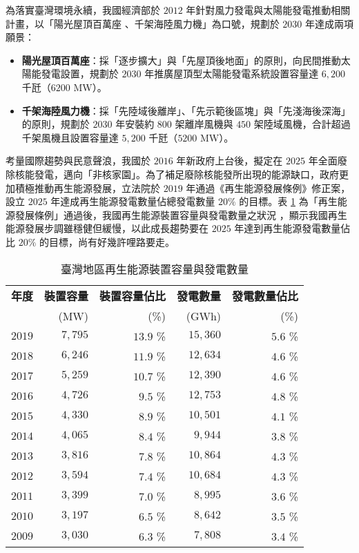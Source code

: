 為落實臺灣環境永續，我國經濟部於 $2012$ 年針對風力發電與太陽能發電推動相關計畫，以「陽光屋頂百萬座 、千架海陸風力機」為口號，規劃於 $2030$ 年達成兩項願景：

\begin{itemize}
  \item \textbf{陽光屋頂百萬座}：採「逐步擴大」與「先屋頂後地面」的原則，向民間推動太陽能發電設置，規劃於 $2030$ 年推廣屋頂型太陽能發電系統設置容量達 $6,200$ 千瓩（$6200$ \si{\MW}）。
  \item \textbf{千架海陸風力機}：採「先陸域後離岸」、「先示範後區塊」與「先淺海後深海」的原則，規劃於 $2030$ 年安裝約 $800$ 架離岸風機與 $450$ 架陸域風機，合計超過千架風機且設置容量達 $5,200$ 千瓩（$5200$ \si{\MW}）。
\end{itemize}

考量國際趨勢與民意聲浪，我國於 $2016$ 年新政府上台後，擬定在 $2025$ 年全面廢除核能發電，邁向「非核家園」。為了補足廢除核能發所出現的能源缺口，政府更加積極推動再生能源發展，立法院於 $2019$ 年通過《再生能源發展條例》修正案，設立 $2025$ 年達成再生能源發電數量佔總發電數量 $20\%$ 的目標。表 \ref{table: Renewable Energy Device Ratio in Taiwan} 為「再生能源發展條例」通過後，我國再生能源裝置容量與發電數量之狀況 \cite{boe-data}，顯示我國再生能源發展步調雖穩健但緩慢，以此成長趨勢要在 $2025$ 年達到再生能源發電數量佔比 $20\%$ 的目標，尚有好幾許哩路要走。

\begin{table}[htp]
  \centering
  \caption[臺灣地區再生能源裝置容量與發電數量]{臺灣地區再生能源裝置容量與發電數量 \cite{boe-data}}
  \begin{tabular}{crrrr}
    \toprule
    \textbf{年度} & \textbf{裝置容量} & \textbf{裝置容量佔比} & \textbf{發電數量} & \textbf{發電數量佔比} \\
    & (\si{\MW}) & (\%) & (\si{GWh}) & (\%) \\
    \midrule
    $2019$ & $7,795$ & $13.9$ \% & $15,360$ & $5.6$ \% \\
    $2018$ & $6,246$ & $11.9$ \% & $12,634$ & $4.6$ \% \\
    $2017$ & $5,259$ & $10.7$ \% & $12,390$ & $4.6$ \% \\
    $2016$ & $4,726$ & $ 9.5$ \% & $12,753$ & $4.8$ \% \\
    $2015$ & $4,330$ & $ 8.9$ \% & $10,501$ & $4.1$ \% \\
    $2014$ & $4,065$ & $ 8.4$ \% & $ 9,944$ & $3.8$ \% \\
    $2013$ & $3,816$ & $ 7.8$ \% & $10,864$ & $4.3$ \% \\
    $2012$ & $3,594$ & $ 7.4$ \% & $10,684$ & $4.3$ \% \\
    $2011$ & $3,399$ & $ 7.0$ \% & $ 8,995$ & $3.6$ \% \\
    $2010$ & $3,197$ & $ 6.5$ \% & $ 8,642$ & $3.5$ \% \\
    $2009$ & $3,030$ & $ 6.3$ \% & $ 7,808$ & $3.4$ \% \\
    \bottomrule
  \end{tabular}
  \label{table: Renewable Energy Device Ratio in Taiwan}
\end{table}

